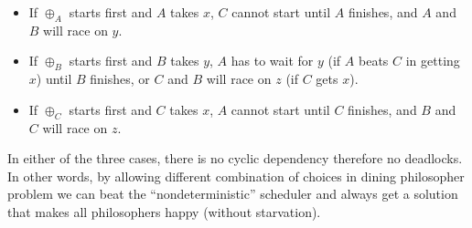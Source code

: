 \begin{itemize}
\item If $\oplus_A$ starts first and $A$ takes $x$, $C$ cannot start until $A$ finishes, and $A$ and $B$ will race on $y$.
\item If $\oplus_B$ starts first and $B$ takes $y$, $A$ has to wait for $y$ (if $A$ beats $C$ in getting $x$) until $B$ finishes, or $C$ and $B$ will race on $z$ (if $C$ gets $x$).
\item If $\oplus_C$ starts first and $C$ takes $x$, $A$ cannot start until $C$ finishes, and $B$ and $C$ will race on $z$.
\end{itemize}

In either of the three cases, there is no cyclic dependency therefore no deadlocks.
In other words, by allowing different combination of choices in dining philosopher problem 
we can beat the ``nondeterministic'' scheduler and always get a solution that makes all
philosophers happy (without starvation).



